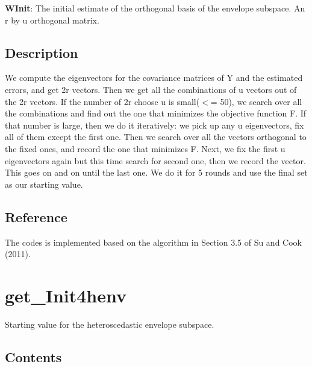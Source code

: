 \documentclass[a4paper,11pt,openany]{memoir}
\begin{document}
\begin{par}
\textbf{WInit}: The initial estimate of the orthogonal basis of the envelope subspace. An r by u orthogonal matrix.
\end{par} \vspace{1em}


\subsection*{Description}

\begin{par}
We compute the eigenvectors for the covariance matrices of Y and the estimated errors, and get 2r vectors.  Then we get all the combinations of u vectors out of the 2r vectors. If the number of 2r choose u is small(\ensuremath{<}= 50), we search over all the combinations and find out the one that minimizes the objective function F. If that number is large, then we do it iteratively: we pick up any u eigenvectors, fix all of them except the first one. Then we search over all the vectors orthogonal to the fixed ones, and record the one that minimizes F. Next, we fix the first u eigenvectors again but this time search for second one, then we record the vector. This goes on and on until the last one. We do it for 5 rounds and use the final set as our starting value.
\end{par} \vspace{1em}


\subsection*{Reference}

\begin{par}
The codes is implemented based on the algorithm in Section 3.5 of Su and Cook (2011).
\end{par} \vspace{1em}

\newpage

\rmfamily
\color{black}\section{get\_Init4henv}

\begin{par}
Starting value for the heteroscedastic envelope subspace.
\end{par} \vspace{1em}

\subsection*{Contents}
\end{document}
